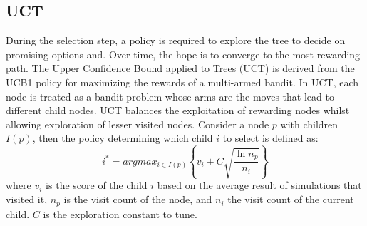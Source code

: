 \documentclass{ecai2014}
\begin{document}

\subsection{UCT}
\label{subsec:uct}
During the selection step, a policy is required to explore the tree to decide on promising options and. Over time, the hope is to converge to the most rewarding path. The Upper Confidence Bound applied to Trees (UCT) \cite{kocsis2006bandit} is derived from the UCB1 policy \cite{auer2002using} for maximizing the rewards of a multi-armed bandit. In UCT, each node is treated as a bandit problem whose arms are the moves that lead to different child nodes. UCT balances the exploitation of rewarding nodes whilst allowing exploration of lesser visited nodes. Consider a node $p$ with children $I(p)$, then the policy determining which child $i$ to select is defined as:
\begin{equation}
\label{eq:uct}
i^* = argmax_{i \in I(p)}\left\{ v_i + C \sqrt{ \frac{\ln{n_p}}{n_i}}\right\}
\end{equation}
where $v_i$ is the score of the child $i$ based on the average result of simulations that visited it, $n_p$ is the visit count of the node, and $n_i$ the visit count of the current child. $C$ is the exploration constant to tune. 
\end{document}
